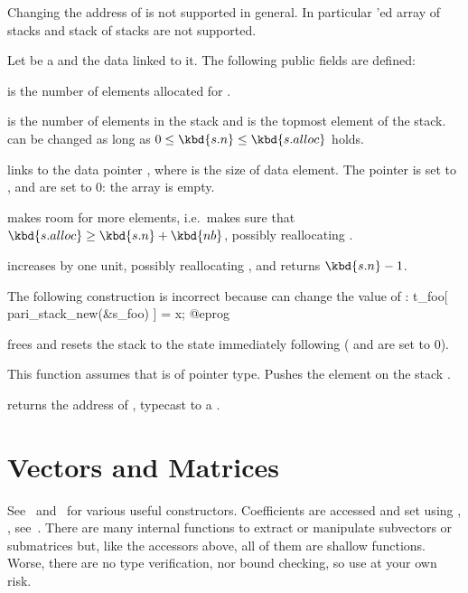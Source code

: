 Changing the address of  is not supported in general.
In particular 'ed array of stacks and stack of stacks are not
supported.

Let  be a  and  the data linked to it. The
following public fields are defined:

\item {} is the number of elements allocated for .

\item {} is the number of elements in the stack and  is
the topmost element of the stack.   can be changed as long as
$0\leq\kbd{s.n}\leq\kbd{s.alloc}$ holds.

 links
 to the data pointer , where  is the size of
data element. The pointer  is set to ,  and
 are set to $0$: the array is empty.

 makes room for 
more elements, i.e.~makes sure that $\kbd{s.alloc}\geq\kbd{s.n} + \kbd{nb}$,
possibly reallocating .

 increases  by one unit,
possibly reallocating , and returns $\kbd{s.n}-1$.

 The following construction is incorrect because
 can change the value of :
\bprog
t_foo[ pari_stack_new(&s_foo) ] = x;
@eprog

 frees  and resets the
stack to the state immediately following  ( and
 are set to $0$).

 This function assumes
that  is of pointer type. Pushes the element  on the stack
.

 returns the address of ,
typecast to a .

\section{Vectors and Matrices}

See~ and~ for various useful constructors.
Coefficients are accessed and set using , ,
see~. There are many internal functions to extract or
manipulate subvectors or submatrices but, like the accessors above, all of
them are shallow functions. Worse, there are no type verification, nor bound
checking, so use at your own risk.

